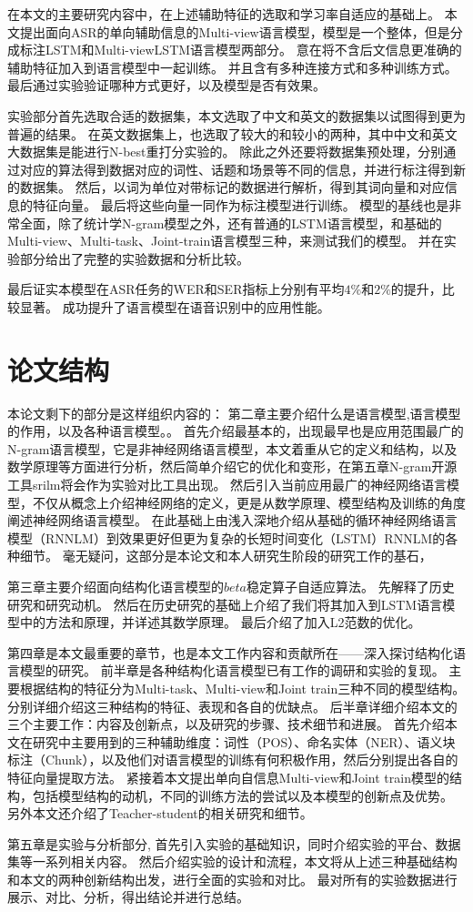 在本文的主要研究内容中，在上述辅助特征的选取和学习率自适应的基础上。
本文提出面向ASR的单向辅助信息的Multi-view语言模型，模型是一个整体，但是分成标注LSTM和Multi-viewLSTM语言模型两部分。
意在将不含后文信息更准确的辅助特征加入到语言模型中一起训练。
并且含有多种连接方式和多种训练方式。最后通过实验验证哪种方式更好，以及模型是否有效果。

实验部分首先选取合适的数据集，本文选取了中文和英文的数据集以试图得到更为普遍的结果。
在英文数据集上，也选取了较大的和较小的两种，其中中文和英文大数据集是能进行N-best重打分实验的。
除此之外还要将数据集预处理，分别通过对应的算法得到数据对应的词性、话题和场景等不同的信息，并进行标注得到新的数据集。
然后，以词为单位对带标记的数据进行解析，得到其词向量和对应信息的特征向量。
最后将这些向量一同作为标注模型进行训练。
模型的基线也是非常全面，除了统计学N-gram模型之外，还有普通的LSTM语言模型，和基础的Multi-view、Multi-task、Joint-train语言模型三种，来测试我们的模型。
并在实验部分给出了完整的实验数据和分析比较。

最后证实本模型在ASR任务的WER和SER指标上分别有平均$4\%$和$2\%$的提升，比较显著。
成功提升了语言模型在语音识别中的应用性能。





\section{论文结构}
本论文剩下的部分是这样组织内容的：
第二章主要介绍什么是语言模型,语言模型的作用，以及各种语言模型。。
首先介绍最基本的，出现最早也是应用范围最广的N-gram语言模型，它是非神经网络语言模型，本文着重从它的定义和结构，以及数学原理等方面进行分析，然后简单介绍它的优化和变形，在第五章N-gram开源工具srilm将会作为实验对比工具出现。
然后引入当前应用最广的神经网络语言模型，不仅从概念上介绍神经网络的定义，更是从数学原理、模型结构及训练的角度阐述神经网络语言模型。
在此基础上由浅入深地介绍从基础的循环神经网络语言模型（RNNLM）到效果更好但更为复杂的长短时间变化（LSTM）RNNLM的各种细节。
毫无疑问，这部分是本论文和本人研究生阶段的研究工作的基石，


第三章主要介绍面向结构化语言模型的$beta$稳定算子自适应算法。
先解释了历史研究和研究动机。
然后在历史研究的基础上介绍了我们将其加入到LSTM语言模型中的方法和原理，并详述其数学原理。
最后介绍了加入L2范数的优化。


第四章是本文最重要的章节，也是本文工作内容和贡献所在——深入探讨结构化语言模型的研究。
前半章是各种结构化语言模型已有工作的调研和实验的复现。
主要根据结构的特征分为Multi-task、Multi-view和Joint train三种不同的模型结构。
分别详细介绍这三种结构的特征、表现和各自的优缺点。
后半章详细介绍本文的三个主要工作：内容及创新点，以及研究的步骤、技术细节和进展。
首先介绍本文在研究中主要用到的三种辅助维度：词性（POS）、命名实体（NER）、语义块标注（Chunk），以及他们对语言模型的训练有何积极作用，然后分别提出各自的特征向量提取方法。
紧接着本文提出单向自信息Multi-view和Joint train模型的结构，包括模型结构的动机，不同的训练方法的尝试以及本模型的创新点及优势。
另外本文还介绍了Teacher-student的相关研究和细节。




第五章是实验与分析部分,
首先引入实验的基础知识，同时介绍实验的平台、数据集等一系列相关内容。
然后介绍实验的设计和流程，本文将从上述三种基础结构和本文的两种创新结构出发，进行全面的实验和对比。
最对所有的实验数据进行展示、对比、分析，得出结论并进行总结。




